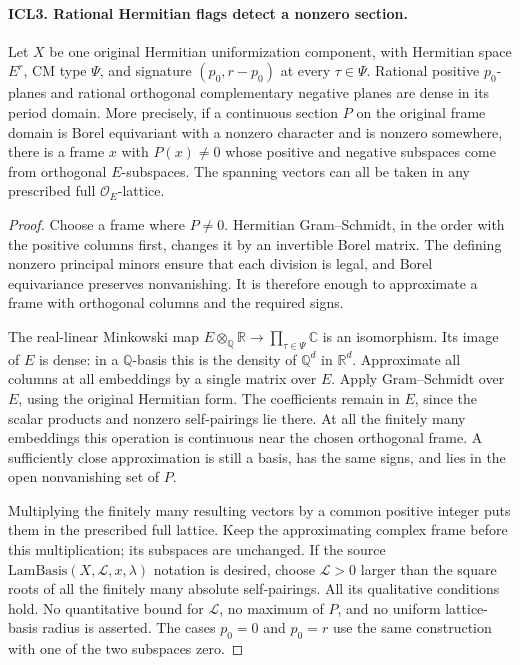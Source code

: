\paragraph{ICL3. Rational Hermitian flags detect a nonzero section.}
\label{claim:ICL3}
Let \(X\) be one original Hermitian uniformization component, with
Hermitian space \(E^r\), CM type \(\Psi\), and signature
\((p_0,r-p_0)\) at every \(\tau\in\Psi\).  Rational positive
\(p_0\)-planes and rational orthogonal complementary negative planes
are dense in its period domain.  More precisely, if a continuous
section \(P\) on the original frame domain is Borel equivariant
with a nonzero character and is nonzero somewhere, there is a frame
\(x\) with \(P(x)\ne0\) whose positive and negative subspaces
come from orthogonal \(E\)-subspaces.  The spanning vectors can all
be taken in any prescribed full \(\mathcal O_E\)-lattice.
\begin{proof}
Choose a frame where \(P\ne0\).  Hermitian Gram--Schmidt, in the
order with the positive columns first, changes it by an invertible
Borel matrix.  The defining nonzero principal minors ensure that
each division is legal, and Borel equivariance preserves
nonvanishing.  It is therefore enough to approximate a frame with
orthogonal columns and the required signs.

The real-linear Minkowski map
\(E\otimes_{\mathbb Q}\mathbb R\to\prod_{\tau\in\Psi}\mathbb C\)
is an isomorphism.  Its image of \(E\) is dense: in a
\(\mathbb Q\)-basis this is the density of \(\mathbb Q^d\) in
\(\mathbb R^d\).  Approximate all columns at all embeddings by a
single matrix over \(E\).  Apply Gram--Schmidt over \(E\), using
the original Hermitian form.  The coefficients remain in \(E\),
since the scalar products and nonzero self-pairings lie there.
At all the finitely many embeddings this operation is continuous
near the chosen orthogonal frame.  A sufficiently close
approximation is still a basis, has the same signs, and lies in
the open nonvanishing set of \(P\).

Multiplying the finitely many resulting vectors by a common
positive integer puts them in the prescribed full lattice.  Keep
the approximating complex frame before this multiplication; its
subspaces are unchanged.  If the source
\(\mathrm{LamBasis}(X,\mathcal L,x,\lambda)\) notation is desired,
choose \(\mathcal L>0\) larger than the square roots of all the
finitely many absolute self-pairings.  All its qualitative
conditions hold.  No quantitative bound for \(\mathcal L\), no
maximum of \(P\), and no uniform lattice-basis radius is asserted.
The cases \(p_0=0\) and \(p_0=r\) use the same construction with
one of the two subspaces zero.
\end{proof}

